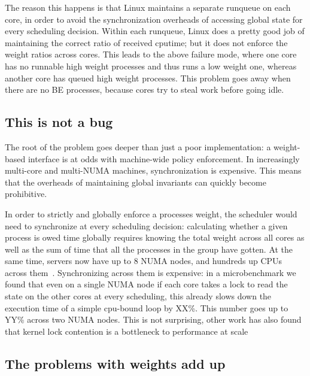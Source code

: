 The reason this happens is that Linux maintains a separate runqueue on each
core, in order to avoid the synchronization overheads of accessing global state
for every scheduling decision. Within each runqueue, Linux does a pretty good
job of maintaining the correct ratio of received cputime; but it does not
enforce the weight ratios across cores. This leads to the above failure mode,
where one core has no runnable high weight processes and thus runs a low weight
one, whereas another core has queued high weight processes. This problem goes
away when there are no BE processes, because cores try to steal work before
going idle.

\subsection{This is not a bug}

The root of the problem goes deeper than just a poor implementation: a
weight-based interface is at odds with machine-wide policy enforcement. In
increasingly multi-core and multi-NUMA machines, synchronization is expensive.
This means that the overheads of maintaining global invariants can quickly
become prohibitive.

In order to strictly and globally enforce a processes weight, the scheduler
would need to synchronize at every scheduling decision: calculating whether a
given process is owed time globally requires knowing the total weight across all
cores as well as the sum of time that all the processes in the group have
gotten. At the same time, servers now have up to 8 NUMA nodes, and hundreds up
CPUs across them~\cite{TODO}. Synchronizing across them is expensive: in a
microbenchmark we found that even on a single NUMA node if each core takes a
lock to read the state on the other cores at every scheduling, this already
slows down the execution time of a simple cpu-bound loop by XX\%. This number
goes up to YY\% across two NUMA nodes. This is not surprising, other work has
also found that kernel lock contention is a bottleneck to performance at
scale~\cite{TODO}


\subsection{The problems with weights add up}


